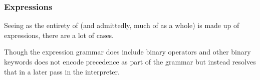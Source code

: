 \subsubsection{Expressions}
\label{sec:expressions}

Seeing as the entirety of \Poetry{} (and admittedly, much of \Trilogy{} as a whole)
is made up of expressions, there are a lot of cases.

Though the expression grammar does include binary operators and other binary keywords
\Trilogy{} does not encode precedence as part of the grammar but instead resolves that
in a later pass in the interpreter.

\begin{bnf*}
     \\
     \\
     \\
     \\
     \\
\end{bnf*}
